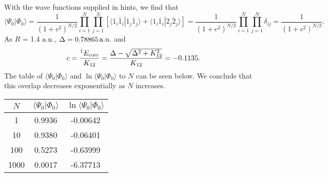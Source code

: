 \documentclass[a4paper]{book}
\newcommand{\corr}{{\rm corr}}
\newcommand{\au}{{\rm a.u.}}
\begin{document}
	\begin{solution}
	
	With the wave functions supplied in hints, we find that	
	\begin{equation}
		\langle \Psi_0 | \Phi_0 \rangle = \frac{1}{(1+c^2)^{N/2}} \prod_{ i=1 }^N \prod_{ j=1 }^N \left[ \langle 1_i \bar{1}_i | 1_j \bar{1}_j \rangle + \langle 1_i \bar{1}_i | 2_j \bar{2}_j \rangle \right] = \frac{1}{(1+c^2)^{N/2}} \prod_{ i=1 }^N \prod_{ j=1 }^N \delta_{ij} = \frac{1}{(1+c^2)^{N/2}}.
	\end{equation}
	As $R$ = 1.4 $\au$, $\Delta = 0.78865 \, \au$ and
	\[
		c = \frac{ ^1 E_\corr }{ K_{12} } = \frac{ \Delta - \sqrt{ \Delta^2 + K^2_{12} } }{ K_{12} } = -0.1135.
	\]
	The table of $\langle \Psi_0 | \Phi_0 \rangle$ and $\ln{\langle \Psi_0 | \Phi_0 \rangle}$ to $N$ can be seen below. We conclude that this overlap decreases exponentially as $N$ increases.

	\begin{minipage}{\textwidth}
    \centering
    \captionsetup{type=table}
    \begin{tabular}{c|c|c} \hline
		$N$	& $\langle \Psi_0 | \Phi_0 \rangle$ & $\ln{\langle \Psi_0 | \Phi_0 \rangle}$ \\ \hline
		 1 	& 0.9936 & -0.00642 \\
		 10 & 0.9380 & -0.06401 \\
		100 & 0.5273 & -0.63999 \\
		1000& 0.0017 & -6.37713 \\ \hline
	\end{tabular}
	\end{minipage}

	\end{solution}
	
	
\end{document}
